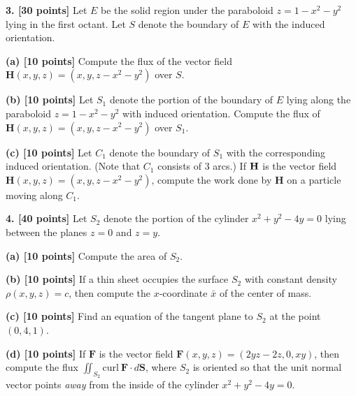 \documentclass{article}
\begin{document}
\begin{spacing}{2}
\noindent \textbf{3. [30 points]} Let $E$ be the solid region under the paraboloid $z = 1 - x^2 - y^2$ lying in the first octant.  Let $S$ denote the boundary of $E$ with the induced orientation. 

\medskip

\noindent \textbf{(a) [10 points]} Compute the flux of the vector field $\mathbf{H}(x,y,z) = (x,y,z -x^2 - y^2)$ over $S$. 

\newpage 



\noindent \textbf{(b) [10 points]} Let $S_1$ denote the portion of the boundary of $E$ lying along the paraboloid $z = 1 - x^2 - y^2$ with induced orientation. Compute the flux of $\mathbf{H}(x,y,z) = (x,y,z - x^2 - y^2)$ over $S_1$. 

\newpage 

\noindent \textbf{(c) [10 points]} Let $C_1$ denote the boundary of $S_1$ with the corresponding induced orientation. (Note that $C_1$ consists of 3 arcs.) If $\bf{H}$ is the vector field $\mathbf{H}(x,y,z) = (x,y,z - x^2 - y^2)$, compute the work done by $\mathbf{H}$ on a particle moving along $C_1$. 


\newpage

\noindent \textbf{4. [40 points]} Let $S_2$ denote the portion of the cylinder $x^2 + y^2 - 4y = 0$ lying between the planes $z = 0$ and $z = y$. 

\noindent \textbf{(a) [10 points]} Compute the area of $S_2$. 

\newpage 

\noindent \textbf{(b) [10 points]} If a thin sheet occupies the surface $S_2$ with constant density $\rho(x,y,z) = c$, then compute the $x$-coordinate $\bar{x}$ of the center of mass. 

\newpage 

\noindent \textbf{(c) [10 points]} Find an equation of the tangent plane to $S_2$ at the point $(0,4,1)$. 

\newpage

\noindent \textbf{(d) [10 points]} If $\mathbf{F}$ is the vector field $\mathbf{F}(x,y,z) = (2yz - 2z, 0 , xy)$, then compute the flux  $\iint_{S_2} \text{curl} \: \mathbf{F} \cdot d\mathbf{S}$, where $S_2$ is oriented so that the unit normal vector points \emph{away} from the inside of the cylinder $x^2 + y^2 - 4y = 0$. 
\end{spacing}
\end{document}
